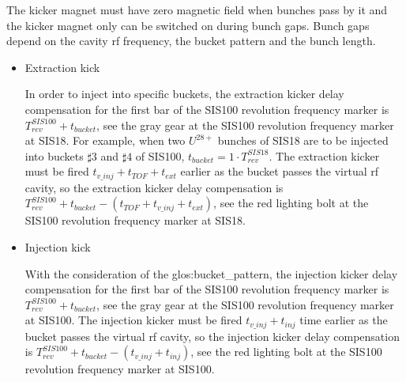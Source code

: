 
The kicker magnet must have zero magnetic field when bunches pass by it and the kicker magnet only can be switched on during bunch gaps. Bunch gaps depend on the cavity rf frequency, the bucket pattern and the bunch length. 

\begin{itemize}
\item Extraction kick

In order to inject into specific buckets, the extraction kicker delay compensation for the first bar of the SIS100 revolution frequency marker is $T_{\mathit{rev}}^{\mathit{SIS100}} + t_{\mathit{bucket}}$, see the gray gear at the SIS100 revolution frequency marker at SIS18. For example, when two $U^{28+}$ bunches of SIS18 are to be injected into buckets $\sharp3$ and $\sharp4$ of SIS100, $t_{\mathit{bucket}} =1 \cdot T_{\mathit{rev}}^{\mathit{SIS18}}$. The extraction kicker must be fired $t_{\mathit{v\_inj}}+t_{\mathit{TOF}}+t_{\mathit{ext}}$ earlier as the bucket passes the virtual rf cavity, so the extraction kicker delay compensation is $T_{\mathit{rev}}^{\mathit{SIS100}} + t_{\mathit{bucket}} - (t_{\mathit{TOF}} + t_{\mathit{v\_inj}} + t_{\mathit{ext}})$, see the red lighting bolt at the SIS100 revolution frequency marker at SIS18. 

\item Injection kick

With the consideration of the \gls{glos:bucket_pattern}, the injection kicker delay compensation for the first bar of the SIS100 revolution frequency marker is $T_{\mathit{rev}}^{\mathit{SIS100}} + t_{\mathit{bucket}}$, see the gray gear at the SIS100 revolution frequency marker at SIS100. The injection kicker must be fired $t_{\mathit{v\_inj}}+t_{\mathit{inj}}$ time earlier as the bucket passes the virtual rf cavity, so the injection kicker delay compensation is $T_{\mathit{rev}}^{\mathit{SIS100}} + t_{\mathit{bucket}} - (t_{\mathit{v\_inj}} + t_{\mathit{inj}})$, see the red lighting bolt at the SIS100 revolution frequency marker at SIS100.
\end{itemize}

